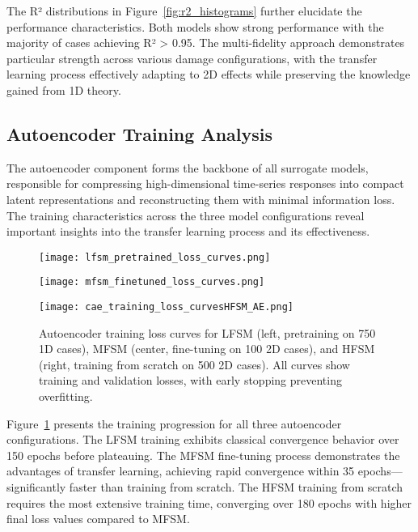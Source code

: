 \documentclass[12pt,a4paper]{report}
\begin{document}
The R² distributions in Figure~\ref{fig:r2_histograms} further elucidate the performance characteristics. Both models show strong performance with the majority of cases achieving R² > 0.95. The multi-fidelity approach demonstrates particular strength across various damage configurations, with the transfer learning process effectively adapting to 2D effects while preserving the knowledge gained from 1D theory.


\subsection{Autoencoder Training Analysis}

The autoencoder component forms the backbone of all surrogate models, responsible for compressing high-dimensional time-series responses into compact latent representations and reconstructing them with minimal information loss. The training characteristics across the three model configurations reveal important insights into the transfer learning process and its effectiveness.

\begin{figure}[htbp]
\centering
\begin{minipage}{0.32\textwidth}
\centering
\texttt{[image: lfsm\_pretrained\_loss\_curves.png]}
\end{minipage}
\hfill
\begin{minipage}{0.32\textwidth}
\centering
\texttt{[image: mfsm\_finetuned\_loss\_curves.png]}
\end{minipage}
\hfill
\begin{minipage}{0.32\textwidth}
\centering
\texttt{[image: cae\_training\_loss\_curvesHFSM\_AE.png]}
\end{minipage}
\caption{Autoencoder training loss curves for LFSM (left, pretraining on 750 1D cases), MFSM (center, fine-tuning on 100 2D cases), and HFSM (right, training from scratch on 500 2D cases). All curves show training and validation losses, with early stopping preventing overfitting.}
\label{fig:loss_curves}
\end{figure}

Figure~\ref{fig:loss_curves} presents the training progression for all three autoencoder configurations. The LFSM training exhibits classical convergence behavior over 150 epochs before plateauing. The MFSM fine-tuning process demonstrates the advantages of transfer learning, achieving rapid convergence within 35 epochs—significantly faster than training from scratch. The HFSM training from scratch requires the most extensive training time, converging over 180 epochs with higher final loss values compared to MFSM.
\end{document}
